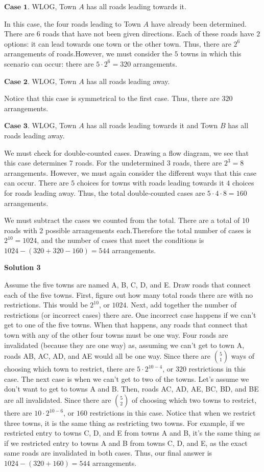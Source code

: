 \begin{enumerate}
 
$\textbf{Case 1}$. WLOG, Town $A$ has all roads leading towards it.

 In this case, the four roads leading to Town $A$ have already been determined. There are $6$ roads that have not been given directions. Each of these roads have $2$ options: it can lead towards one town or the other town. Thus, there are $2^6$ arrangements of roads.However, we must consider the $5$ towns in which this scenario can occur: there are $5 \cdot 2^6=320$ arrangements.

 
$\textbf{Case 2}$. WLOG, Town $A$ has all roads leading away.

 Notice that this case is symmetrical to the first case. Thus, there are $320$ arrangements.

 
$\textbf{Case 3}$. WLOG, Town $A$ has all roads leading towards it and Town $B$ has all roads leading away.

 We must check for double-counted cases. Drawing a flow diagram, we see that this case determines $7$ roads. For the undetermined $3$ roads, there are $2^3=8$ arrangements. However, we must again consider the different ways that this case can occur. There are $5$ choices for towns with roads leading towards it $4$ choices for roads leading away. Thus, the total double-counted cases are $5 \cdot 4 \cdot 8=160$ arrangements.

 We must subtract the cases we counted from the total. There are a total of $10$ roads with $2$ possible arrangements each.Therefore the total number of cases is $2^{10} =1024$, and the number of cases that meet the conditions is $1024 - (320+320-160) = \boxed{544}$ arrangements.

 



\textbf{Solution 3}

Assume the five towns are named A, B, C, D, and E. Draw roads that connect each of the five towns. First, figure out how many total roads there are with no restrictions. This would be $2^{10}$, or $1024$. Next, add together the number of restrictions (or incorrect cases) there are. One incorrect case happens if we can't get to one of the five towns. When that happens, any roads that connect that town with any of the other four towns must be one way. Four roads are invalidated (because they are one way) as, assuming we can't get to town A, roads AB, AC, AD, and AE would all be one way. Since there are ${{5\choose1}}$ ways of choosing which town to restrict, there are $5\cdot2^{10-4}$, or $320$ restrictions in this case. The next case is when we can't get to two of the towns. Let's assume we don't want to get to towns A and B. Then, roads AC, AD, AE, BC, BD, and BE are all invalidated.  Since there are ${{5\choose2}}$ of choosing which two towns to restrict, there are $10\cdot2^{10-6}$, or $160$ restrictions in this case. Notice that when we restrict three towns, it is the same thing as restricting two towns. For example, if we restricted entry to towns C, D, and E from towns A and B, it's the same thing as if we restricted entry to towns A and B from towns C, D, and E, as the exact same roads are invalidated in both cases. Thus, our final answer is $1024-(320+160) = \boxed{544}$ arrangements.


\end{enumerate}
